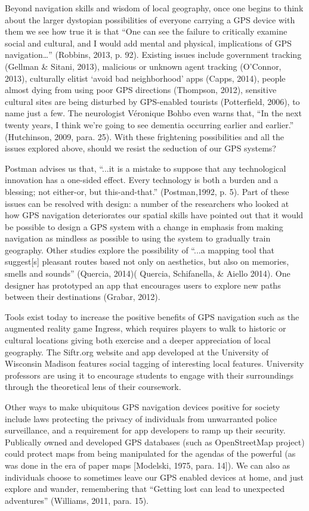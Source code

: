 \documentclass[a4paper]{article}
\begin{document}
Beyond navigation skills and wisdom of local geography, once one begins to think about the larger dystopian possibilities of everyone carrying a GPS device with them we see how true it is that “One can see the failure to critically examine social and cultural, and I would add mental and physical, implications of GPS navigation…” (Robbins, 2013, p. 92). Existing issues include government tracking (Gellman \& Sitani, 2013), malicious or unknown agent tracking (O’Connor, 2013), culturally elitist ‘avoid bad neighborhood’ apps (Capps, 2014), people almost dying from using poor GPS directions (Thompson, 2012), sensitive cultural sites are being disturbed by GPS-enabled tourists (Potterfield, 2006), to name just a few. The neurologist Véronique Bohbo even warns that, “In the next twenty years, I think we’re going to see dementia occurring earlier and earlier.” (Hutchinson, 2009, para. 25).  With these frightening possibilities and all the issues explored above, should we resist the seduction of our GPS systems? 

Postman advises us that, “...it is a mistake to suppose that any technological innovation has a one-sided effect. Every technology is both a burden and a blessing; not either-or, but this-and-that.” (Postman,1992, p. 5). Part of these issues can be resolved with design: a number of the researchers who looked at how GPS navigation deteriorates our spatial skills have pointed out that it would be possible to design a GPS system with a change in emphasis from making navigation as mindless as possible to using the system to gradually train geography. Other studies explore the possibility of “...a mapping tool that suggest[s] pleasant routes based not only on aesthetics, but also on memories, smells and sounds” (Quercia, 2014)( Quercia, Schifanella, \& Aiello 2014). One designer has prototyped an app that encourages users to explore new paths between their destinations (Grabar, 2012).

Tools exist today to increase the positive benefits of GPS navigation such as the augmented reality game Ingress, which requires players to walk to historic or cultural locations giving both exercise and a deeper appreciation of local geography. The Siftr.org website and app developed at the University of Wisconsin Madison features social tagging of interesting local features. University professors are using it to encourage students to engage with their surroundings through the theoretical lens of their coursework.

Other ways to make ubiquitous GPS navigation devices positive for society include laws protecting the privacy of individuals from unwarranted police surveillance, and a requirement for app developers to ramp up their security. Publically owned and developed GPS databases (such as OpenStreetMap project) could protect maps from being manipulated for the agendas of the powerful (as was done in the era of paper maps [Modelski, 1975, para. 14]). We can also as individuals choose to sometimes leave our GPS enabled devices at home, and just explore and wander, remembering that “Getting lost can lead to unexpected adventures” (Williams, 2011, para. 15).
\end{document}
